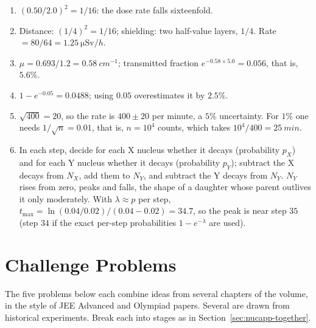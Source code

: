 {\begin{enumerate}[itemsep=2pt]
\item $(0.50/2.0)^2=1/16$: the dose rate falls sixteenfold.
\item Distance: $(1/4)^2=1/16$; shielding: two half-value layers, $1/4$. Rate $=80/64=\SI{1.25}{\micro\sievert/h}$.
\item $\mu=0.693/1.2=\SI{0.58}{cm^{-1}}$; transmitted fraction $e^{-0.58\times5.0}=0.056$, that is, $5.6\%$.
\item $1-e^{-0.05}=0.0488$; using $0.05$ overestimates it by $2.5\%$.
\item $\sqrt{400}=20$, so the rate is $400\pm20$ per minute, a $5\%$ uncertainty. For $1\%$ one needs
      $1/\sqrt n=0.01$, that is, $n=10^4$ counts, which takes $10^4/400=\SI{25}{min}$.
\item In each step, decide for each X nucleus whether it decays (probability $p_X$) and for each Y nucleus
      whether it decays (probability $p_Y$); subtract the X decays from $N_X$, add them to $N_Y$, and subtract
      the Y decays from $N_Y$. $N_Y$ rises from zero, peaks and falls, the shape of a daughter whose parent
      outlives it only moderately. With $\lambda\approx p$ per step, $t_{\max}=\ln(0.04/0.02)/(0.04-0.02)=34.7$,
      so the peak is near step $35$ (step $34$ if the exact per-step probabilities $1-e^{-\lambda}$ are used).
\end{enumerate}
}

\section{Challenge Problems}\label{sec:challenge-nucapps}

The five problems below each combine ideas from several chapters of the volume, in the style of JEE
Advanced and Olympiad papers. Several are drawn from historical experiments. Break each into stages as
in Section~\ref{sec:nucapp-together}.

